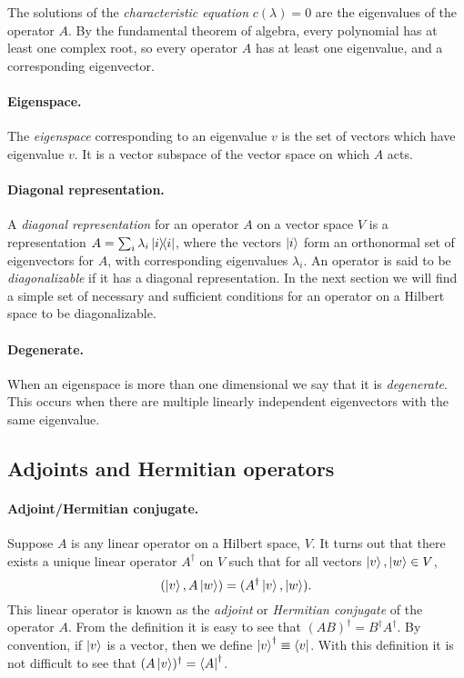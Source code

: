\documentclass{article}
\begin{document}
The solutions of the \emph{characteristic equation} $c(\lambda) = 0$ are the eigenvalues of the operator $A$. By the fundamental theorem of algebra, every polynomial has at least one complex root, so every operator $A$ has at least one eigenvalue, and a corresponding eigenvector.

\paragraph{Eigenspace.} The \emph{eigenspace} corresponding to an eigenvalue $v$ is the set of vectors which have eigenvalue $v$. It is a vector subspace of the vector space on which $A$ acts.

\paragraph{Diagonal representation.} A \emph{diagonal representation} for an operator $A$ on a vector space $V$ is a representation $A = \sum_i \lambda_i\ketbra{i}{i}$, where the vectors $\ket{i}$ form an orthonormal set of eigenvectors for $A$, with corresponding eigenvalues $\lambda_i$. An operator is said to be \emph{diagonalizable} if it has a diagonal representation. In the next section we will find a simple set of necessary and sufficient conditions for an operator on a Hilbert space to be diagonalizable.

\paragraph{Degenerate.} When an eigenspace is more than one dimensional we say that it is \emph{degenerate}. This occurs when there are multiple linearly independent eigenvectors with the same eigenvalue.

\subsection{Adjoints and Hermitian operators}

\paragraph{Adjoint/Hermitian conjugate.} Suppose $A$ is any linear operator on a Hilbert space, $V$. It turns out that there exists a unique linear operator $A^\dagger$ on $V$ such that for all vectors $\ket{v}, \ket{w} \in V$, \begin{equation} \label{eq:adj}
  (\ket{v}, A\ket{w}) = (A^\dagger \ket{v}, \ket{w}).
\end{equation}
This linear operator is known as the \emph{adjoint} or \emph{Hermitian conjugate} of the operator $A$. From the definition it is easy to see that $(AB)^\dagger = B^\dagger A^\dagger$. By convention, if $\ket{v}$ is a vector, then we define $\ket{v}^\dagger \equiv \bra{v}$. With this definition it is not difficult to see that $(A\ket{v})^\dagger = \bra A^\dagger$.
\end{document}
